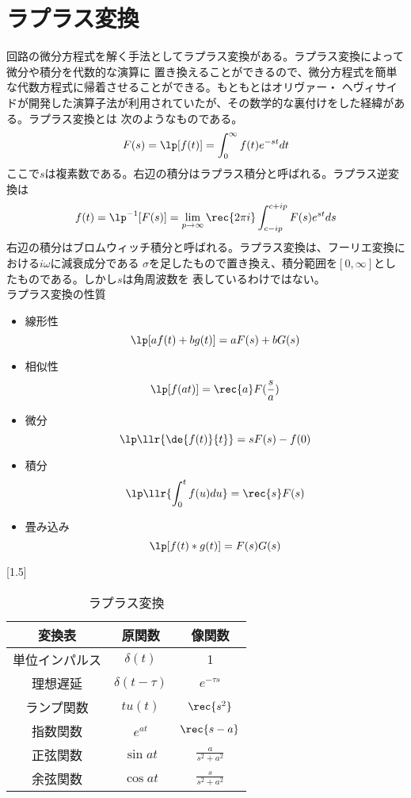     \section{ラプラス変換}
        回路の微分方程式を解く手法としてラプラス変換がある。ラプラス変換によって微分や積分を代数的な演算に
        置き換えることができるので、微分方程式を簡単な代数方程式に帰着させることができる。もともとはオリヴァー・
        ヘヴィサイドが開発した演算子法が利用されていたが、その数学的な裏付けをした経緯がある。ラプラス変換とは
        次のようなものである。
            \[F(s) = \lp[f(t)] = \int_0^{\infty} f(t)e^{-st}dt\]
        ここで$s$は複素数である。右辺の積分はラプラス積分と呼ばれる。ラプラス逆変換は
            \[f(t) = \lp^{-1}[F(s)] = \lim_{p \to \infty} \rec{2\pi i}\int_{c-ip}^{c+ip} F(s)e^{st}ds\]
        右辺の積分はブロムウィッチ積分と呼ばれる。ラプラス変換は、フーリエ変換における$i\omega$に減衰成分である
        $\sigma$を足したもので置き換え、積分範囲を$[0,\infty]$としたものである。しかし$s$は角周波数を
        表しているわけではない。\\
        ラプラス変換の性質
        \begin{itemize}
            \item 線形性\[\lp[af(t)+bg(t)] = aF(s)+bG(s)\]
            \item 相似性\[\lp[f(at)] = \rec{a}F(\frac{s}{a})\]
            \item 微分\[\lp\llr{\de{f(t)}{t}} = sF(s)-f(0)\]
            \item 積分\[\lp\llr{\int_0^t f(u)du} = \rec{s}F(s)\]
            \item 畳み込み\[\lp[f(t) * g(t)] = F(s)G(s)\]
        \end{itemize}
        \begin{table}[h]
            \begin{center}\caption{\large ラプラス変換}
            \scalebox{1.5}[1.5]{
                \begin{tabular}{|c|c|c|}\hline
                    変換表 & 原関数 & 像関数\\ \hline
                    単位インパルス & $\delta(t)$ & 1\\ \hline
                    理想遅延 & $\delta(t - \tau)$ & $e^{-\tau s}$\\ \hline
                    ランプ関数 & $tu(t)$ & $\rec{s^2}$\\ \hline
                    指数関数 & $e^{at}$ & $\rec{s-a}$\\ \hline
                    正弦関数 & $\sin at$ & $\displaystyle\frac{a}{s^2+a^2}$\\ \hline
                    余弦関数 & $\cos at$ & $\displaystyle\frac{s}{s^2+a^2}$\\ \hline
                \end{tabular}
            }\end{center}
        \end{table}
